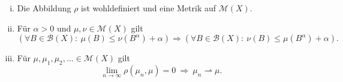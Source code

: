 \begin{proposition}
    \begin{enumerate}[(i)]
        \item Die Abbildung $\rho$ ist wohldefiniert und eine Metrik auf $\mathcal{M}(X)$. 
        \item Für $\alpha > 0$ und $\mu, \nu \in \mathcal{M}(X)$ gilt
        $$
            (\forall B \in \mathcal{B}(X): \ \mu(B) \leq \nu(B^{\alpha}) + \alpha) \Rightarrow (\forall B \in \mathcal{B}(X): \ \nu(B) \leq \mu(B^{\alpha}) + \alpha).
        $$
        \item Für $\mu, \mu_1, \mu_2,... \in \mathcal{M}(X)$ gilt 
        $$
            \lim_{n \to \infty} \rho(\mu_n, \mu) = 0 \ \Rightarrow \ \mu_n \rightharpoonup \mu. 
        $$
    \end{enumerate}
\end{proposition}

